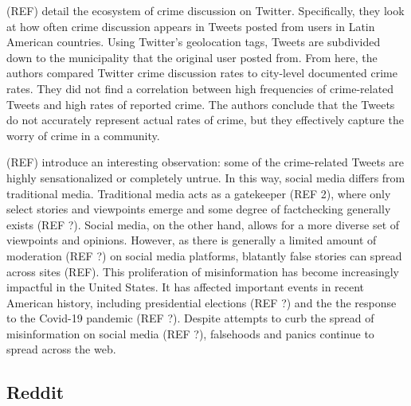 \documentclass[12pt,oneside, letterpaper]{book}
\begin{document}
(REF) detail the ecosystem of crime discussion on Twitter. Specifically, they look at how often crime discussion appears in Tweets posted from users in Latin American countries. Using Twitter's geolocation tags, Tweets are subdivided down to the municipality that the original user posted from. From here, the authors compared Twitter crime discussion rates to city-level documented crime rates. They did not find a correlation between high frequencies of crime-related Tweets and high rates of reported crime. The authors conclude that the Tweets do not accurately represent actual rates of crime, but they effectively capture the worry of crime in a community.


(REF) introduce an interesting observation: some of the crime-related Tweets are highly sensationalized or completely untrue. In this way, social media differs from traditional media. Traditional media acts as a gatekeeper (REF 2), where only select stories and viewpoints emerge and some degree of factchecking generally exists (REF ?). Social media, on the other hand, allows for a more diverse set of viewpoints and opinions. However, as there is generally a limited amount of moderation (REF ?) on social media platforms, blatantly false stories can spread across sites (REF). This proliferation of misinformation has become increasingly impactful in the United States. It has affected important events in recent American history, including presidential elections (REF ?) and the the response to the Covid-19 pandemic (REF ?). Despite attempts to curb the spread of misinformation on social media (REF ?), falsehoods and panics continue to spread across the web.

\subsection{Reddit}

\end{document}
